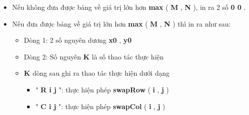 \begin{itemize}
	\item     Nếu không đưa được bảng về giá trị lớn hơn    \textbf{     max    }    (    \textbf{     M    }    ,    \textbf{     N    }    ), in ra 2 số    \textbf{     0 0    }    .   
	\item     Nếu đưa được bảng về giá trị lớn hơn    \textbf{     max    }    (    \textbf{     M    }    ,    \textbf{     N    }    ) thì in ra như sau:    
\begin{itemize}
	\item       Dòng 1: 2 số nguyên dương      \textbf{       x0      }      ,      \textbf{       y0      }
	\item       Dòng 2: Số nguyên      \textbf{       K      }      là số thao tác thực hiện     
	\item \textbf{       K      }      dòng sau ghi ra thao tác thực hiện dưới dạng      
\begin{itemize}
	\item         "        \textbf{         R i j        }        ": thực hiện phép        \textbf{         swapRow        }        (        \textbf{         i        }        ,        \textbf{         j        }        )       
	\item         "        \textbf{         C i j        }        ": thực hiện phép        \textbf{         swapCol        }        (        \textbf{         i        }        ,        \textbf{         j        }        )       
\end{itemize}
\end{itemize}
\end{itemize}